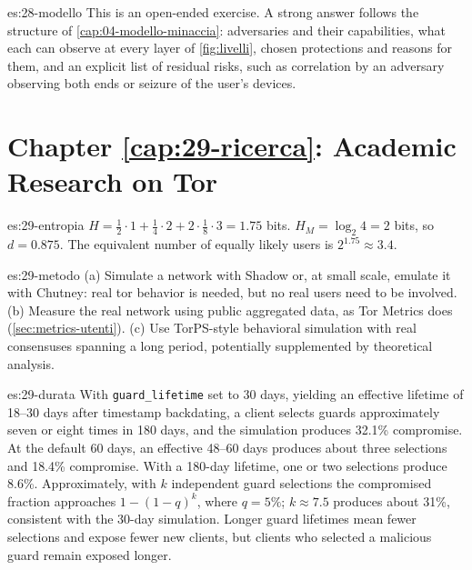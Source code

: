 \begin{soluzione}{es:28-modello}
This is an open-ended exercise. A strong answer follows the structure of \cref{cap:04-modello-minaccia}: adversaries and their capabilities, what each can observe at every layer of \cref{fig:livelli}, chosen protections and reasons for them, and an explicit list of residual risks, such as correlation by an adversary observing both ends or seizure of the user's devices.
\end{soluzione}

\section*{Chapter \ref{cap:29-ricerca}: Academic Research on Tor}

\begin{soluzione}{es:29-entropia}
$H = \tfrac12 \cdot 1 + \tfrac14 \cdot 2 + 2 \cdot \tfrac18 \cdot 3 = 1.75$ bits. $H_M = \log_2 4 = 2$ bits, so $d = 0.875$. The equivalent number of equally likely users is $2^{1.75} \approx 3.4$.
\end{soluzione}

\begin{soluzione}{es:29-metodo}
(a) Simulate a network with Shadow or, at small scale, emulate it with Chutney: real tor behavior is needed, but no real users need to be involved. (b) Measure the real network using public aggregated data, as Tor Metrics does (\cref{sec:metrics-utenti}). (c) Use TorPS-style behavioral simulation with real consensuses spanning a long period, potentially supplemented by theoretical analysis.
\end{soluzione}

\begin{soluzione}{es:29-durata}
With \texttt{guard\_lifetime} set to 30 days, yielding an effective lifetime of 18--30 days after timestamp backdating, a client selects guards approximately seven or eight times in 180 days, and the simulation produces 32.1\% compromise. At the default 60 days, an effective 48--60 days produces about three selections and 18.4\% compromise. With a 180-day lifetime, one or two selections produce 8.6\%. Approximately, with $k$ independent guard selections the compromised fraction approaches $1-(1-q)^k$, where $q = 5\%$; $k\approx 7.5$ produces about 31\%, consistent with the 30-day simulation. Longer guard lifetimes mean fewer selections and expose fewer new clients, but clients who selected a malicious guard remain exposed longer.
\end{soluzione}

